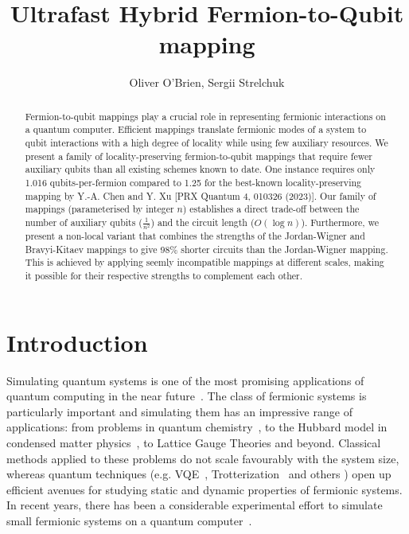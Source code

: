 \documentclass[pdftex,pra,aps,twocolumn,twoside]{revtex4-2}
\theoremstyle{plain}
\theoremstyle{note}
\newcommand\+{{\footnotesize \raisebox{0.3ex}{+}}}
\begin{document}
\title{Ultrafast Hybrid Fermion-to-Qubit mapping}
\author{Oliver O'Brien, Sergii Strelchuk}
\begin{abstract}

Fermion-to-qubit mappings play a crucial role in representing fermionic interactions on a quantum computer. Efficient mappings translate fermionic modes of a system to qubit interactions with a high degree of locality while using few auxiliary resources.  We present a family of locality-preserving fermion-to-qubit mappings that require fewer auxiliary qubits than all existing schemes known to date. One instance requires only 1.016 qubits-per-fermion compared to 1.25 for the best-known locality-preserving mapping by Y.-A. Chen and Y. Xu [PRX Quantum 4, 010326 (2023)]. Our family of mappings (parameterised by integer $n$) establishes a direct trade-off between the number of auxiliary qubits ($\frac{1}{n^2}$) and the circuit length ($O(\log n)$). Furthermore, we present a non-local variant that combines the strengths of the Jordan-Wigner and Bravyi-Kitaev mappings to give 98\% shorter circuits than the Jordan-Wigner mapping. This is achieved by applying seemly incompatible mappings at different scales, making it possible for their respective strengths to complement each other.

\vspace{1.12cm}
\end{abstract}
\maketitle

\section{Introduction}
Simulating quantum systems is one of the most promising applications of quantum computing in the near future~\cite{feynman2018simulating,lloyd1996universal,ortiz2002simulating}. The class of fermionic systems is particularly important and simulating them has an impressive range of applications: from problems in quantum chemistry~\cite{mcardle2020quantum,reiher2017elucidating}, to the Hubbard model in condensed matter physics~\cite{abrams1997simulation}, to Lattice Gauge Theories \cite{banuls2020simulating,chakraborty2022classically} and beyond. Classical methods applied to these problems do not scale favourably with the system size, whereas quantum techniques (e.g. VQE~\cite{mcclean2016theory}, Trotterization~\cite{tranter2019ordering} and others \cite{bravyi2002fermionic,friesner2005ab,ortiz2001quantum}) open up efficient avenues for studying static and dynamic properties of fermionic systems. In recent years, there has been a considerable experimental effort to simulate small fermionic systems on a quantum computer~\cite{barends2015digital,kokail2019self}.
\end{document}
